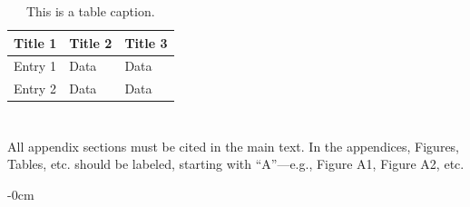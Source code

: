 \documentclass[technologies,article,submit,pdftex,moreauthors]{Definitions/mdpi}
\begin{document}
\begin{table}[H] 
\caption{This is a table caption.\label{tab5}}
\begin{tabularx}{\textwidth}{CCC}
\toprule
\textbf{Title 1}	& \textbf{Title 2}	& \textbf{Title 3}\\
\midrule
Entry 1		& Data			& Data\\
Entry 2		& Data			& Data\\
\bottomrule
\end{tabularx}
\end{table}

\section[\appendixname~\thesection]{}
All appendix sections must be cited in the main text. In the appendices, Figures, Tables, etc. should be labeled, starting with ``A''---e.g., Figure A1, Figure A2, etc.

\begin{adjustwidth}{-\extralength}{0cm}






\PublishersNote{}
\end{adjustwidth}
\end{document}
